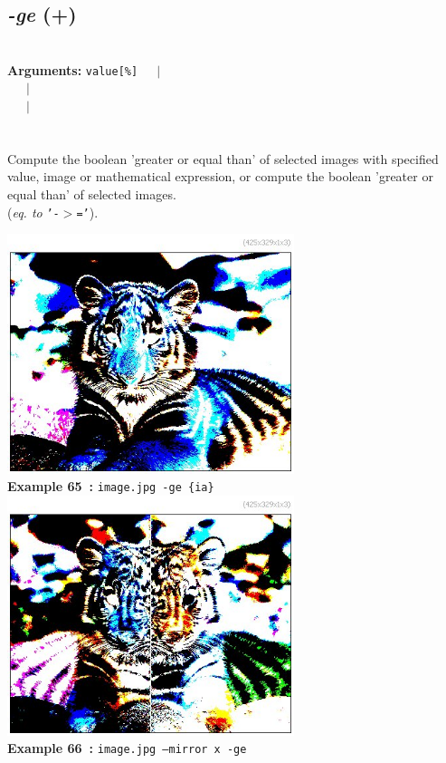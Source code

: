 \documentclass[a4paper,11pt,twoside]{book}
\begin{document}
\subsection{\emph{-ge} (+)}\vspace*{-0.5em}
~\\\textbf{Arguments: } 
{\small \texttt{value[\%]}}~~~$|$\\
\hspace*{2.2cm}{\small \texttt{[image]}}~~~$|$\\
~~~$|$\\
\\~\\
Compute the boolean 'greater or equal than' of selected images with specified value, image
or mathematical expression, or compute the boolean 'greater or equal than' of selected images.
~\\(\emph{eq. to} {\small \texttt{'-$>$='}}).
\begin{center}\includegraphics[keepaspectratio=true,height=7cm,width=\textwidth]{img/gmic_def65.jpg}\\
{\footnotesize \textbf{Example 65~:} \texttt{image.jpg -ge \{ia\}}}
\\\includegraphics[keepaspectratio=true,height=7cm,width=\textwidth]{img/gmic_def66.jpg}\\
{\footnotesize \textbf{Example 66~:} \texttt{image.jpg --mirror x -ge}}
\end{center}
\end{document}
